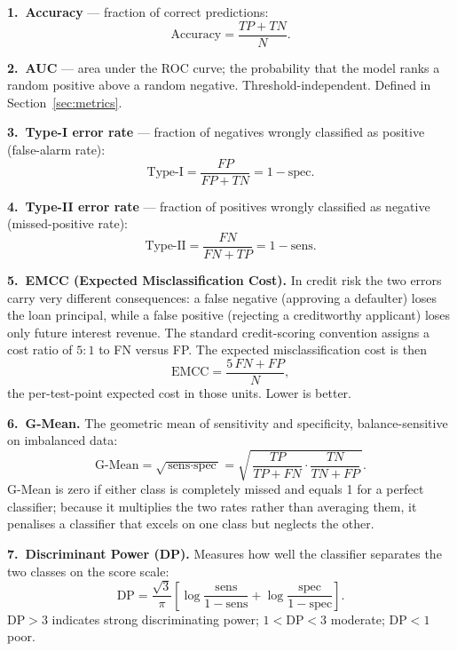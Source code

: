 \textbf{1.\ Accuracy} --- fraction of correct predictions:
\begin{equation}
\text{Accuracy}=\frac{TP+TN}{N}.
\tag{4.2}
\label{eq:acc-tm}
\end{equation}

\textbf{2.\ AUC} --- area under the ROC curve; the probability that
the model ranks a random positive above a random negative.
Threshold-independent.  Defined in Section~\ref{sec:metrics}.

\textbf{3.\ Type-I error rate} --- fraction of negatives wrongly
classified as positive (false-alarm rate):
\begin{equation}
\text{Type-I}=\frac{FP}{FP+TN}=1-\text{spec}.
\tag{4.3}
\label{eq:type1}
\end{equation}

\textbf{4.\ Type-II error rate} --- fraction of positives wrongly
classified as negative (missed-positive rate):
\begin{equation}
\text{Type-II}=\frac{FN}{FN+TP}=1-\text{sens}.
\tag{4.4}
\label{eq:type2}
\end{equation}

\textbf{5.\ EMCC (Expected Misclassification Cost).}  In credit risk
the two errors carry very different consequences: a false negative
(approving a defaulter) loses the loan principal, while a false
positive (rejecting a creditworthy applicant) loses only future
interest revenue.  The standard credit-scoring convention assigns a
cost ratio of $5{:}1$ to FN versus FP.  The expected
misclassification cost is then
\begin{equation}
\text{EMCC}
=
\frac{5\,FN + FP}{N},
\tag{4.5}
\label{eq:emcc}
\end{equation}
the per-test-point expected cost in those units.  Lower is better.

\textbf{6.\ G-Mean.}  The geometric mean of sensitivity and
specificity, balance-sensitive on imbalanced data:
\begin{equation}
\text{G-Mean}
=
\sqrt{\,\text{sens}\cdot\text{spec}\,}
=
\sqrt{\,\frac{TP}{TP+FN}\cdot\frac{TN}{TN+FP}\,}.
\tag{4.6}
\label{eq:gmean}
\end{equation}
G-Mean is zero if either class is completely missed and equals 1 for
a perfect classifier; because it multiplies the two rates rather
than averaging them, it penalises a classifier that excels on one
class but neglects the other.

\textbf{7.\ Discriminant Power (DP).}  Measures how well the
classifier separates the two classes on the score scale:
\begin{equation}
\text{DP}
=
\frac{\sqrt{3}}{\pi}\left[
\log\!\frac{\text{sens}}{1-\text{sens}}
+\log\!\frac{\text{spec}}{1-\text{spec}}
\right].
\tag{4.7}
\label{eq:dp}
\end{equation}
$\text{DP}>3$ indicates strong discriminating power;
$1<\text{DP}<3$ moderate; $\text{DP}<1$ poor.

